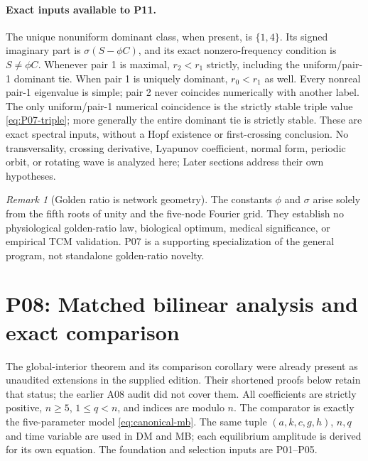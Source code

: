 \documentclass[11pt]{article}
\theoremstyle{definition}
\theoremstyle{remark}
\newtheorem{remark}[theorem]{Remark}
\begin{document}
\paragraph{Exact inputs available to P11.}
The unique nonuniform dominant class, when present, is $\{1,4\}$.
Its signed imaginary part is $\sigma(S-\phi C)$, and its exact
nonzero-frequency condition is $S\ne\phi C$. Whenever pair 1 is
maximal, $r_2<r_1$ strictly, including the uniform/pair-1 dominant tie.
When pair 1 is uniquely dominant, $r_0<r_1$ as well.
Every nonreal pair-1 eigenvalue is simple; pair 2 never coincides
numerically with another label. The only uniform/pair-1 numerical
coincidence is the strictly stable triple value
\eqref{eq:P07-triple}; more generally the entire dominant tie is
strictly stable. These are exact spectral inputs, without a Hopf
existence or first-crossing conclusion. No transversality, crossing
derivative, Lyapunov coefficient, normal form, periodic orbit, or rotating
wave is analyzed here; Later sections address their own hypotheses.

\begin{remark}[Golden ratio is network geometry]
\label{rem:P07-geometry}
The constants $\phi$ and $\sigma$ arise solely from the fifth roots of
unity and the five-node Fourier grid. They establish no physiological
golden-ratio law, biological optimum, medical significance, or empirical
TCM validation. P07 is a supporting specialization of the general program, not standalone golden-ratio novelty. 
\end{remark}


\section{P08: Matched bilinear analysis and exact comparison}
\label{sec:P08}

The global-interior theorem and its comparison corollary were already
present as unaudited extensions in the supplied edition. Their shortened
proofs below retain that status; the earlier A08 audit did not cover them.
All coefficients are strictly positive, $n\ge5$, $1\le q<n$, and indices
are modulo $n$. The comparator is exactly the five-parameter model
\eqref{eq:canonical-mb}. The same tuple $(a,k,c,g,h)$, $n,q$ and time
variable are used in DM and MB; each equilibrium amplitude is derived
for its own equation. The foundation and selection inputs are P01--P05.
\end{document}
